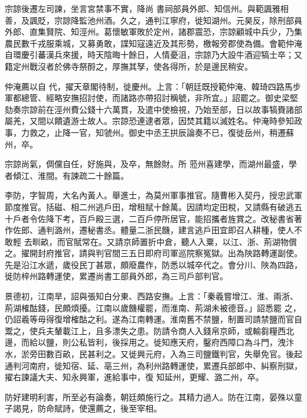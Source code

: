 \begin{pinyinscope}
 宗諒後遷左司諫，坐言宮禁事不實，降尚
 書祠部員外郎、知信州。與範諷雅相善，及諷貶，宗諒降監池州酒。久之，通判江寧府，徙知湖州。元昊反，除刑部員外郎、直集賢院、知涇州。葛懷敏軍敗於定州，諸郡震恐，宗諒顧城中兵少，乃集農民數千戎服乘城，又募勇敢，諜知寇遠近及其形勢，檄報旁郡使為備。會範仲淹自環慶引蕃漢兵來援，時天陰晦十餘日，人情憂沮，宗諒乃大設牛酒迎犒士卒；又籍定州戰沒者於佛寺祭酹之，厚撫其孥，使各得所，於是邊民稍安。



 仲淹薦以自
 代，擢天章閣待制，徙慶州。上言：「朝廷既授範仲淹、韓琦四路馬步軍都總管、經略安撫招討使，而諸路亦帶招討稱號，非所宜。」詔罷之。御史梁堅劾奏宗諒前在涇州費公錢十六萬貫，及遣中使檢視，乃始至部，日以故事犒賚諸部屬羌，又間以饋遺游士故人。宗諒恐連逮者眾，因焚其籍以滅姓名。仲淹時參知政事，力救之，止降一官，知虢州。御史中丞王拱辰論奏不已，復徙岳州，稍遷蘇州，卒。



 宗諒尚氣，倜儻自任，好施與，及卒，無餘財。所
 蒞州喜建學，而湖州最盛，學者傾江、淮間。有諫疏二十餘篇。



 李防，字智周，大名內黃人。舉進士，為莫州軍事推官。隨曹彬入契丹，授忠武軍節度推官。括磁、相二州逃戶田，增租賦十餘萬。因請均定田稅，又請縣有破逃五十戶者令佐降下考，百戶殿三選，二百戶停所居官，能招攜者旌賞之。改秘書省著作佐郎、通判潞州，遷秘書丞。體量二浙民饑，建言逃戶田宜即召人耕種，使人不敢輕
 去甽畝，而官賦常在。又請京師置折中倉，聽人入粟，以江、浙、荊湖物償之。擢開封府推官，請與判官間三五日即府司軍巡院察冤獄。出為陜路轉運副使。先是沿江水遞，歲役民丁甚眾，頗廢農作，防悉以城卒代之。會分川、陜為四路，徙防梓州路轉運使，累遷尚書工部員外郎，為三司戶部判官。



 景德初，江南旱，詔與張知白分東、西路安撫。上言：「秦羲嘗增江、淮、兩浙、荊湖榷酤錢，民頗煩擾。江南以歲饑權罷，而淮南、荊湖未被德音。」詔悉罷
 之，仍詔羲等毋得復增榷酤之利。遂為江南轉運。淮南舊不禁鹽，制置司請禁鹽而官自鬻之，使兵夫輦載江上，且多漂失之患。防請令商人入錢帛京師，或輸芻糧西北邊，而給以鹽，則公私皆利，後採用之。徙知應天府，鑿府西障口為斗門，洩汴水，淤旁田數百畝，民甚利之。又徙興元府，入為三司鹽鐵判官，失舉免官。後起通判河南府，徙知宿、延、亳三州，為利州路轉運使，累遷兵部郎中、糾察刑獄，擢右諫議大夫、知永興軍，進給事中，復
 知延州，更耀、潞二州，卒。



 防好建明利害，所至必有論奏，朝廷頗施行之。其精力過人。防在江南，晏殊以童子謁見，防命賦詩，使還薦之，後至宰相。




\end{pinyinscope}
